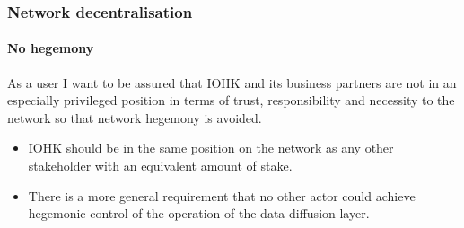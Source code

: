\documentclass{report}
\theoremstyle{definition}{
  \newtheorem{lemma}{Lemma}[section] %
  \newtheorem{definition}[lemma]{Definition}
}
\theoremstyle{theorem}{
  \newtheorem{invariant}[lemma]{Invariant}
  \newtheorem{proofobligation}[lemma]{Proof Obligation}
}
\numberwithin{equation}{lemma}
\begin{document}
\subsubsection{Network decentralisation}

\paragraph{No hegemony}

As a user I want to be assured that IOHK and its business partners are not in
an especially privileged position in terms of trust, responsibility and
necessity to the network so that network hegemony is avoided.

\begin{itemize}
\item IOHK should be in the same position on the network as any other
      stakeholder with an equivalent amount of stake.
\item There is a more general requirement that no other actor could
      achieve hegemonic control of the operation of the data diffusion layer.
\end{itemize}
\end{document}

